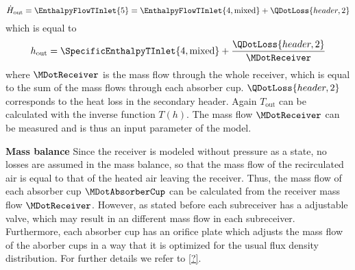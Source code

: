 \begin{equation}
    \dot{H}_{\mathrm{out}} = \EnthalpyFlowTInlet{5} = \EnthalpyFlowTInlet{4,\mathrm{mixed}} + \QDotLoss{header,2}
\end{equation}
which is equal to
\begin{equation}
    h_{\mathrm{out}} = \SpecificEnthalpyTInlet{4,\mathrm{mixed}} + \frac{\QDotLoss{header,2}}{\MDotReceiver}
\end{equation}
where \(\MDotReceiver\) is the mass flow through the whole receiver, which is equal to the sum of the mass flows through each absorber cup.
\(\QDotLoss{header,2}\) corresponds to the heat loss in the secondary header.
Again \(T_{\mathrm{out}}\) can be calculated with the inverse function \(T(h)\).
The mass flow \(\MDotReceiver\) can be measured and is thus an input parameter of the model.

\textbf{Mass balance}
Since the receiver is modeled without pressure as a state, no losses are assumed in the mass balance, so that the mass flow of the recirculated air is equal to that of the heated air leaving the receiver.
Thus, the mass flow of each absorber cup \(\MDotAbsorberCup\) can be calculated from the receiver mass flow \(\MDotReceiver\).
However, as stated before each subreceiver has a adjustable valve, which may result in an different mass flow in each subreceiver.
Furthermore, each absorber cup has an orifice plate which adjusts the mass flow of the aborber cups in a way that it is optimized for the usual flux density distribution.
For further details we refer to \cref{?}.

